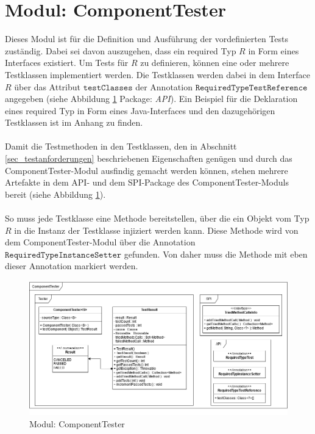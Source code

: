 \section{Modul: ComponentTester}
Dieses Modul ist für die Definition und Ausführung der vordefinierten Tests zuständig. Dabei sei davon auszugehen, dass ein required Typ $R$ in Form eines Interfaces existiert. Um Tests für $R$ zu definieren, können eine oder mehrere Testklassen implementiert werden. Die Testklassen werden dabei in dem Interface $R$ über das Attribut $\texttt{testClasses}$ der Annotation $\texttt{RequiredTypeTestReference}$ angegeben (siehe Abbildung \ref{fig_cdCompTester} Package: \emph{API}). Ein Beispiel für die Deklaration eines required Typ in Form eines Java-Interfaces und den dazugehörigen Testklassen ist im Anhang zu finden.
\\\\
Damit die Testmethoden in den Testklassen, den in Abschnitt \ref{sec_testanforderungen} beschriebenen Eigenschaften genügen und durch das ComponentTester-Modul ausfindig gemacht werden können, stehen mehrere Artefakte in dem API- und dem SPI-Package des ComponentTester-Moduls bereit (siehe Abbildung \ref{fig_cdCompTester}).
\\\\
So muss jede Testklasse eine Methode bereitstellen, über die ein Objekt vom Typ $R$ in die Instanz der Testklasse injiziert werden kann. Diese Methode wird von dem ComponentTester-Modul über die Annotation $\texttt{RequiredTypeInstanceSetter}$ gefunden. Von daher muss die Methode mit eben dieser Annotation markiert werden.
\begin{figure}
\centering
\includegraphics[scale=0.5]{pics/cd_ComponentTester.png}
\caption{Modul: ComponentTester}
\label{fig_cdCompTester}
\end{figure}
\\\\
